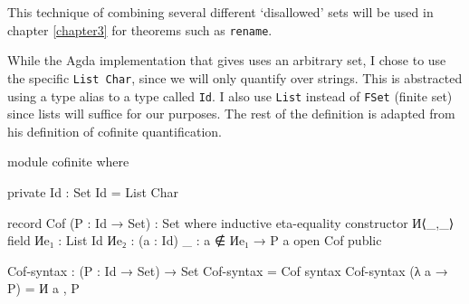 This technique of combining several different `disallowed' sets will be used in chapter
\ref{chapter3} for theorems such as \texttt{rename}.

While the Agda implementation that \citet{pitts_locally_2023} gives uses an arbitrary set, I chose
to use the specific \texttt{List Char}, since we will only quantify over strings. This is abstracted
using a type alias to a type called \texttt{Id}. I also use \texttt{List} instead of \texttt{FSet}
(finite set) since lists will suffice for our purposes. The rest of the definition is adapted from
his definition of cofinite quantification.
\begin{code}
module cofinite where
\end{code}
\begin{comment}
\begin{code}
  -- Data types (naturals, strings, characters)
  open import Data.Nat using (ℕ; zero; suc; _≤_; z≤n; s≤s)
  open import Data.Nat.Properties using (≤-refl; ≤-trans; ≤-antisym; ≤-total)
  open import Data.Char using (Char)
  open import Data.Char.Properties using () renaming (_≟_ to _≟char_)

  -- Relations and predicates/decidability.
  import Relation.Binary.PropositionalEquality as Eq
  open Eq using (_≡_; _≢_; refl; sym; trans; cong)
  open import Relation.Binary.Definitions using (DecidableEquality)
  open import Relation.Nullary.Decidable using (Dec)
  open import Relation.Unary using (Decidable)
  open import Relation.Binary using () renaming (Decidable to BinaryDecidable)
  open import Relation.Nullary.Negation using (contradiction)

  -- Lists.
  open import Data.List using (List; []; _∷_; _++_; length; filter; map; foldr; head; replicate)
  open import Data.List.Properties using (≡-dec)
  import Data.List.Membership.DecPropositional as DecPropMembership
  open import Data.List.Relation.Unary.All using (All; all?; lookup)
    renaming (fromList to All-fromList; toList to All-toList)
  open import Data.List.Relation.Unary.Any using (Any; here; there)
  open import Data.List.Extrema Data.Nat.Properties.≤-totalOrder using (max; xs≤max)

  -- Import list membership using List Char comparisons.
  private
    _≟lchar_ : ∀ (xs ys : List Char) → Dec (xs ≡ ys)
    xs ≟lchar ys = ≡-dec (_≟char_) xs ys

  open DecPropMembership _≟lchar_ using (_∈_; _∉_; _∈?_)
\end{code}
\end{comment}
\begin{code}
  private
    Id : Set
    Id = List Char

  record Cof (P : Id → Set) : Set where
    inductive
    eta-equality
    constructor И⟨_,_⟩
    field
      Иe₁ : List Id
      Иe₂ : (a : Id) {_ : a ∉ Иe₁} → P a
  open Cof public

  Cof-syntax : (P : Id → Set) → Set
  Cof-syntax = Cof
  syntax Cof-syntax (λ a → P) = И a , P
\end{code}
